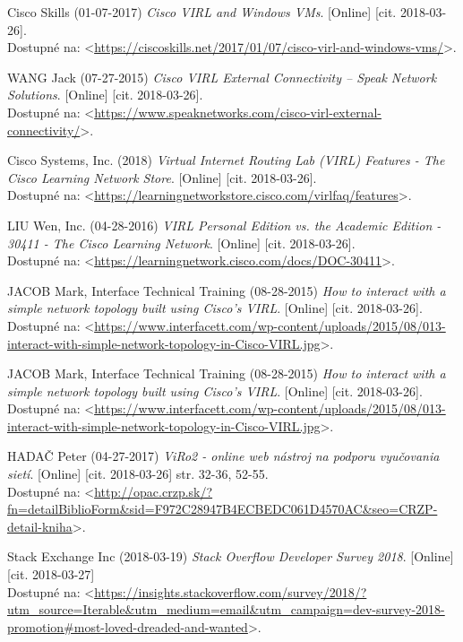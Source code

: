 \begin{thebibliography}{99}
Cisco Skills (01-07-2017) {\it Cisco VIRL and Windows VMs}. [Online] [cit. 2018-03-26]. \\
Dostupné na: <\url{https://ciscoskills.net/2017/01/07/cisco-virl-and-windows-vms/}>.

WANG Jack (07-27-2015) {\it Cisco VIRL External Connectivity – Speak Network Solutions}. [Online] [cit. 2018-03-26]. \\
Dostupné na: <\url{https://www.speaknetworks.com/cisco-virl-external-connectivity/}>.

Cisco Systems, Inc. (2018) {\it Virtual Internet Routing Lab (VIRL) Features - The Cisco Learning Network Store}. [Online] [cit. 2018-03-26]. \\
Dostupné na: <\url{https://learningnetworkstore.cisco.com/virlfaq/features}>.

LIU Wen, Inc. (04-28-2016) {\it VIRL Personal Edition vs. the Academic Edition - 30411 - The Cisco Learning Network}. [Online] [cit. 2018-03-26]. \\
Dostupné na: <\url{https://learningnetwork.cisco.com/docs/DOC-30411}>.

JACOB Mark, Interface Technical Training (08-28-2015) {\it How to interact with a simple network topology built using Cisco’s VIRL}. [Online] [cit. 2018-03-26]. \\
Dostupné na: <\url{https://www.interfacett.com/wp-content/uploads/2015/08/013-interact-with-simple-network-topology-in-Cisco-VIRL.jpg}>.

JACOB Mark, Interface Technical Training (08-28-2015) {\it How to interact with a simple network topology built using Cisco’s VIRL}. [Online] [cit. 2018-03-26]. \\
Dostupné na: <\url{https://www.interfacett.com/wp-content/uploads/2015/08/013-interact-with-simple-network-topology-in-Cisco-VIRL.jpg}>.

HADAČ Peter (04-27-2017) {\it ViRo2 - online web nástroj na podporu vyučovania sietí}. [Online] [cit. 2018-03-26] str. 32-36, 52-55. \\
Dostupné na: <\url{http://opac.crzp.sk/?fn=detailBiblioForm&sid=F972C28947B4ECBEDC061D4570AC&seo=CRZP-detail-kniha}>.

Stack Exchange Inc (2018-03-19) {\it Stack Overflow Developer Survey 2018}. [Online] [cit. 2018-03-27] \\
Dostupné na: <\url{https://insights.stackoverflow.com/survey/2018/?utm_source=Iterable&utm_medium=email&utm_campaign=dev-survey-2018-promotion#most-loved-dreaded-and-wanted}>.


\end{thebibliography}
